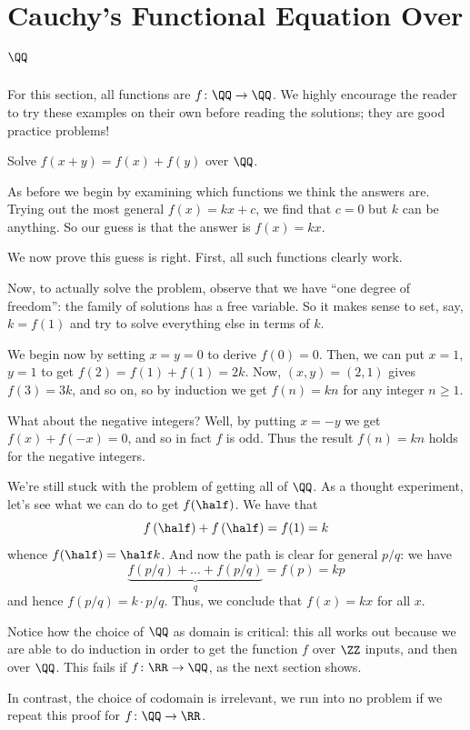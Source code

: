 \documentclass[11pt]{scrartcl}
\begin{document}
\section{Cauchy's Functional Equation Over $\QQ$}
For this section, all functions are $f \colon \QQ \to \QQ$.
We highly encourage the reader to try these examples on their own
before reading the solutions;
they are good practice problems!

\begin{example}
  Solve $f(x+y) = f(x) + f(y)$ over $\QQ$.
\end{example}
\begin{soln}
  As before we begin by examining which
  functions we think the answers are.
  Trying out the most general $f(x) = kx+c$,
  we find that $c=0$ but $k$ can be anything.
  So our guess is that the answer is $f(x) = kx$.

  We now prove this guess is right. First, all such functions clearly work.

  Now, to actually solve the problem,
  observe that we have ``one degree of freedom'':
  the family of solutions has a free variable.
  So it makes sense to set, say, $k = f(1)$
  and try to solve everything else in terms of $k$.

  We begin now by setting $x=y=0$ to derive $f(0) = 0$.
  Then, we can put $x=1$, $y=1$ to get $f(2) = f(1)+f(1) = 2k$.
  Now, $(x,y) = (2,1)$ gives $f(3) = 3k$, and so on,
  so by induction we get $f(n) = kn$ for any integer $n \ge 1$.

  What about the negative integers?
  Well, by putting $x=-y$ we get $f(x) + f(-x) = 0$, and so in fact $f$ is odd.
  Thus the result $f(n) = kn$ holds for the negative integers.

  We're still stuck with the problem of getting all of $\QQ$.
  As a thought experiment, let's see what we can do to get $f(\half)$.
  We have that
  \[ f\left(\half\right) + f\left(\half\right) = f(1) = k \]
  whence $f(\half) = \half k$.
  And now the path is clear for general $p/q$: we have
  \[ \underbrace{f(p/q) + \dots + f(p/q)}_q = f(p) = kp \]
  and hence $f(p/q) = k \cdot p/q$.
  Thus, we conclude that $f(x) = kx$ for all $x$.
\end{soln}

\begin{remark}
Notice how the choice of $\QQ$ as domain is critical:
this all works out because we are able to do induction
in order to get the function $f$ over $\ZZ$ inputs,
and then over $\QQ$.
This fails if $f \colon \RR \to \QQ$, as the next section shows.

In contrast, the choice of codomain is irrelevant,
we run into no problem if we repeat this proof for $f \colon \QQ \to \RR$.
\end{remark}
\end{document}
